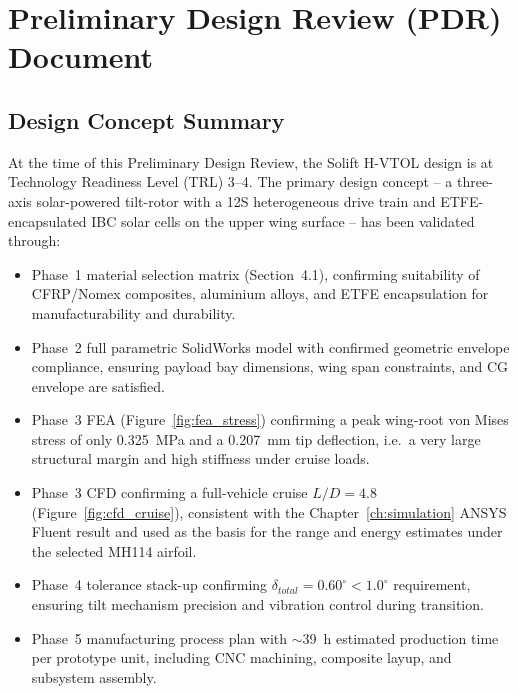 \chapter{Preliminary Design Review (PDR) Document}

\section{Design Concept Summary}

At the time of this Preliminary Design Review, the Solift H-VTOL design is at Technology Readiness Level (TRL) 3--4. The primary design concept -- a three-axis solar-powered tilt-rotor with a 12S heterogeneous drive train and ETFE-encapsulated IBC solar cells on the upper wing surface -- has been validated through:

\begin{itemize}[noitemsep]
    \item Phase~1 material selection matrix (Section~4.1), confirming suitability of CFRP/Nomex composites, aluminium alloys, and ETFE encapsulation for manufacturability and durability.
    \item Phase~2 full parametric SolidWorks model with confirmed geometric envelope compliance, ensuring payload bay dimensions, wing span constraints, and CG envelope are satisfied.
    \item Phase~3 FEA (Figure~\ref{fig:fea_stress}) confirming a peak wing-root von Mises stress of only \SI{0.325}{MPa} and a \SI{0.207}{mm} tip deflection, i.e.\ a very large structural margin and high stiffness under cruise loads.
    \item Phase~3 CFD confirming a full-vehicle cruise $L/D = 4.8$ (Figure~\ref{fig:cfd_cruise}), consistent with the Chapter~\ref{ch:simulation} ANSYS Fluent result and used as the basis for the range and energy estimates under the selected MH114 airfoil.
    \item Phase~4 tolerance stack-up confirming $\delta_{total} = 0.60^\circ < 1.0^\circ$ requirement, ensuring tilt mechanism precision and vibration control during transition.
    \item Phase~5 manufacturing process plan with $\sim$39~h estimated production time per prototype unit, including CNC machining, composite layup, and subsystem assembly.
\end{itemize}

